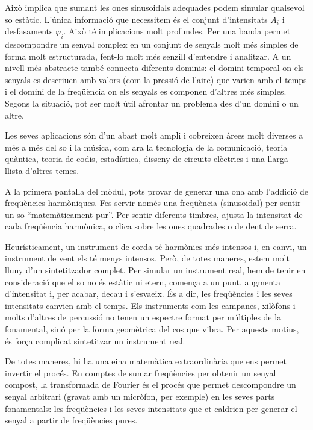 Això implica que sumant les ones sinusoidals adequades podem simular qualsevol so estàtic. L'única informació que necessitem és el conjunt d'intensitats $A_i$ i desfasaments  $\varphi_i$. Això té implicacions molt profundes. Per una banda permet descompondre un senyal complex en un conjunt de senyals molt més simples de forma molt estructurada, fent-lo molt més senzill d'entendre i analitzar. A un nivell més abstracte també connecta diferents dominis: el domini temporal on els senyals es descriuen amb valors (com la pressió de l'aire) que varien amb el temps i el domini de la freqüència on els senyals es componen d'altres més simples. Segons la situació, pot ser molt útil afrontar un problema des d'un domini o un altre.

Les seves aplicacions són d'un abast molt ampli i cobreixen àrees molt diverses a més a més del so i la música, com ara la tecnologia de la comunicació, teoria quàntica, teoria de codis, estadística, disseny de circuits elèctrics i una llarga llista d'altres temes.

A la primera pantalla del mòdul, pots provar de generar una ona amb l'addició de freqüències harmòniques. Fes servir només una freqüència (sinusoidal) per sentir un so ``matemàticament pur''. Per sentir diferents timbres, ajusta la intensitat de cada freqüència harmònica, o clica sobre les ones quadrades o de dent de serra.

Heurísticament, un instrument de corda té harmònics més intensos i, en canvi, un instrument de vent els té menys intensos. Però, de totes maneres, estem molt lluny d'un sintetitzador complet. Per simular un instrument real, hem de tenir en consideració que el so no és estàtic ni etern, comença a un punt, augmenta d'intensitat i, per acabar, decau i s'esvaeix. És a dir, les freqüències i les seves intensitats canvien amb el temps. Els instruments com les campanes, xilòfons i molts d'altres de percussió no tenen un espectre format per múltiples de la fonamental, sinó per la forma geomètrica del cos que vibra. Per aquests motius, és força complicat sintetitzar un instrument real.

De totes maneres, hi ha una eina matemàtica extraordinària que ens permet invertir el procés. En comptes de sumar freqüències per obtenir un senyal compost, la transformada de Fourier és el procés que permet descompondre un senyal arbitrari (gravat amb un micròfon, per exemple) en les seves parts fonamentals: les freqüències i les seves intensitats que et caldrien per generar el senyal a partir de freqüències pures.

